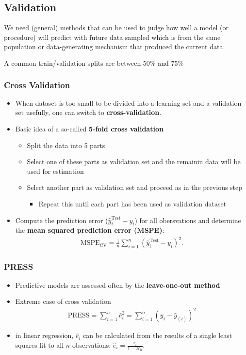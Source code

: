 \subsection{Validation}
We need (general) methods that can be used to judge how well a model (or
procedure) will predict with future data sampled which is from the same
population or data-generating mechanism that produced the current data.

A common train/validation splits are between 50\;\% and 75\;\%

\subsubsection{Cross Validation}
\begin{itemize}
\item When dataset is too small to be divided into a learning set and a
validation set usefully, one can switch to \textbf{cross-validation}.
\item Basic idea of a so-called \textbf{5-fold cross validation}
\begin{itemize}
\item Split the data into 5 parts
\item Select one of these parts as validation set and the remainin data will be
used for estimation
\item Select another part as validation set and proceed as in the previous step
\begin{itemize}
\item Repeat this until each part has been used as validation dataset
\end{itemize}
\end{itemize}
\item Compute the prediction error ($\widehat{y}_i^\text{Test} - y_i$) for all
obersvations and determine the \textbf{mean squared prediction error (MSPE)}:
\begin{align*}
\text{MSPE}_\text{CV}
=
\frac{1}{n} \sum_{i=1}^n \left(\widehat{y}_i^\text{Test} - y_i\right)^2.
\end{align*}
\end{itemize}

\subsubsection{PRESS}
\begin{itemize}
\item Predictive models are assessed often by the \textbf{leave-one-out
method}
\item Extreme case of cross validation
\begin{align*}
\text{PRESS}
=
\sum_{i=1}^n \widehat{e}_i^2
=
\sum_{i=1}^n \left( y_i - \widehat{y}_{(i)}\right)^2
\end{align*}
\item in linear regression, $\widehat{e}_i$ can be calculated from the
results of a single least squares fit to all $n$ observations:
$\widehat{e}_i=\frac{r_i}{1-H_{ii}}$.
\end{itemize}

